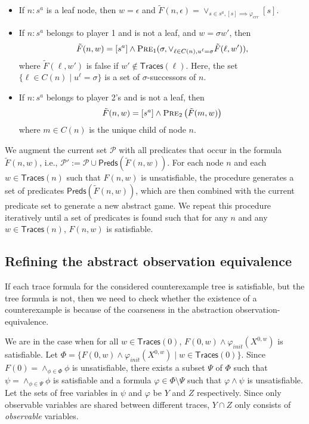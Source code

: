 \documentclass[letterpaper, 10 pt, conference]{ieeeconf}
\begin{document}
\begin{itemize}
\item If $n:s^a$ is a leaf node, then $w=\epsilon$
  and $\tilde{F}(n,\epsilon)=\lor_{s\in s^a, [s]\implies \varphi_{err}} [s] $.
\item If $n:s^a$ belongs to player 1 and is not a leaf, and $w =\sigma
  w'$, then
\vspace{-1ex}
\[
\tilde{F}(n,w)= [s^a]\land \textsc{Pre}_1(\sigma, \lor_{\ell \in C(n),
  u^\ell = \sigma}
\tilde{F}(\ell,w')),
\]
where $\tilde{F}(\ell,w')$ is false if $w'\notin \mathsf{Traces}(\ell)$. Here, the set
$\{\ell \in C(n)\mid u^{\ell}=\sigma \}$ is a set of
$\sigma$-successors of $n$. \item If $n:s^a$ belongs to player 2's and is not a leaf, then 
\vspace{-0.5ex}
\[
\tilde{F}(n,w)= [s^a]\land \textsc{Pre}_2\left(\tilde{F}(m, w)\right)
\]
where $m\in C(n)$ is the unique child of node $n$.
\end{itemize}

We augment the current set $\mathcal{P}$ with all
predicates that occur in the formula $\tilde F(n,w)$, i.e.,
$
\mathcal{P}':=\mathcal{P}\cup \mathsf{Preds}(\tilde F(n,w)).
$
For each node $n$ and each $w\in \mathsf{Traces}(n)$ such that $
F(n,w)$ is unsatisfiable, the procedure generates a set of predicates
$\mathsf{Preds}(\tilde F(n,w))$, which are then combined with the
current predicate set to generate a new abstract game. We repeat
this procedure iteratively until a set of predicates is found such
that for any $n$ and any $w \in \mathsf{Traces}(n)$, $ F(n,w)$ is satisfiable.

\subsection{Refining the abstract observation equivalence}
\label{subsec:refineobeq}
If each trace formula for the considered counterexample tree is satisfiable, but the tree formula is not, then we need to check
whether the existence of a counterexample is because of the
coarseness in the abstraction observation-equivalence.

We are in the case when for all $w\in
\mathsf{Traces}(0)$,  $F(0,w) \wedge \varphi_{init}(X^{0,w})$ is satisfiable.  Let
$\Phi=\{F(0, w)\wedge \varphi_{init}(X^{0,w})\mid w \in \mathsf{Traces}(0)\}$. Since $F(0) = \land_{\phi\in \Phi} \phi$ is unsatisfiable, there exists a subset $\Psi$ of
$\Phi$ such that $\psi= \land_{\phi\in \Psi} \phi$ is satisfiable and
a formula $\varphi \in \Phi \setminus \Psi$ such that $\varphi\land \psi$ is unsatisfiable. Let the sets of
free variables in $\psi$ and $\varphi$ be $Y$ and $Z$
respectively. Since only observable variables are shared between
different traces, $Y\cap Z$ only consists of \emph{observable}
variables.
\end{document}
